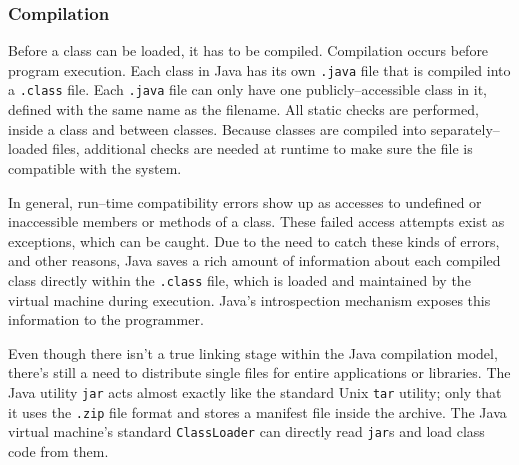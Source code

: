 \subsubsection{Compilation}
  Before a class can be loaded, it has to be compiled.  Compilation occurs before program execution.  Each class in Java has its own \texttt{.java} file that is compiled into a \texttt{.class} file.  Each \texttt{.java} file can only have one publicly--accessible class in it, defined with the same name as the filename.  All static checks are performed, inside a class and between classes.  Because classes are compiled into separately--loaded files, additional checks are needed at runtime to make sure the file is compatible with the system.

  In general, run--time compatibility errors show up as accesses to undefined or inaccessible members or methods of a class.  These failed access attempts exist as exceptions, which can be caught.  Due to the need to catch these kinds of errors, and other reasons, Java saves a rich amount of information about each compiled class directly within the \texttt{.class} file, which is loaded and maintained by the virtual machine during execution.  Java's introspection mechanism exposes this information to the programmer.

  Even though there isn't a true linking stage within the Java compilation model, there's still a need to distribute single files for entire applications or libraries.  The Java utility \texttt{jar} acts almost exactly like the standard Unix \texttt{tar} utility; only that it uses the \texttt{.zip} file format and stores a manifest file inside the archive.  The Java virtual machine's standard \texttt{ClassLoader} can directly read \texttt{jar}s and load class code from them.


